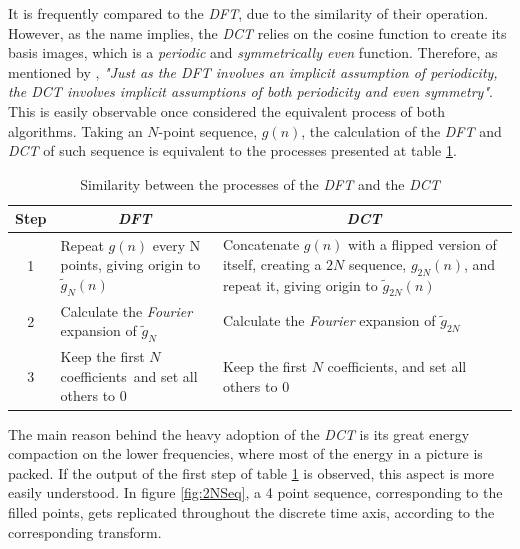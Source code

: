 It is frequently compared to the \emph{DFT}, due to the similarity of their operation. However, as the name implies, the \emph{DCT} relies on the cosine function to create its basis images, which is a \emph{periodic} and \emph{symmetrically even} function. Therefore, as mentioned by \cite[A. V. Oppenheim]{oppenheimDiscretetimeSignalProcessing1998}, \emph{"Just as the DFT involves an implicit assumption of periodicity, the DCT involves implicit assumptions of both periodicity and even symmetry"}.  This is easily observable once considered the equivalent process of both algorithms. Taking an $N$-point sequence, $g(n)$, the calculation of the \emph{DFT} and \emph{DCT} of such sequence is equivalent to the processes presented at table \ref{tab:DFTDCT}.

\begin{table}[h]
    \centering
    \begin{tabular}{cllll@{}} \toprule
        \textbf{Step} &      \multicolumn{2}{c}{\textbf{\emph{DFT}}} &      \multicolumn{2}{c}{\textbf{\emph{DCT}}} \\ \toprule
        1 &         \multicolumn{2}{p{0.35\textwidth}}{Repeat $g(n)$ every N points, giving origin to $\widetilde{g}_N(n)$} &         \multicolumn{2}{p{0.35\textwidth}}{Concatenate $g(n)$ with a flipped version of itself, creating a $2N$ sequence, $g_{2N}(n)$, and repeat it, giving origin to $\widetilde{g}_{2N}(n)$}\\ 
        2 &         \multicolumn{2}{p{0.35\textwidth}}{Calculate the \emph{Fourier} expansion of $\widetilde{g}_N$} &         \multicolumn{2}{p{0.35\textwidth}}{Calculate the \emph{Fourier} expansion of $\widetilde{g}_{2N}$}\\ 
        3 &         \multicolumn{2}{p{0.35\textwidth}}{Keep the first $N$ coefficients\, and set all others to $0$} &         \multicolumn{2}{p{0.35\textwidth}}{Keep the first $N$ coefficients, and set all others to $0$}\\ 
        \bottomrule
    \end{tabular}
    \caption{Similarity between the processes of the        \emph{DFT} and the \emph{DCT}}
    \label{tab:DFTDCT}
\end{table}

The main reason behind the heavy adoption of the \emph{DCT} is its great energy compaction on the lower frequencies, where most of the energy in a picture is packed. If the output of the first step of table \ref{tab:DFTDCT} is observed, this aspect is more easily understood. In figure \ref{fig:2NSeq}, a 4 point sequence, corresponding to the filled points, gets replicated throughout the discrete time axis, according to the corresponding transform.

